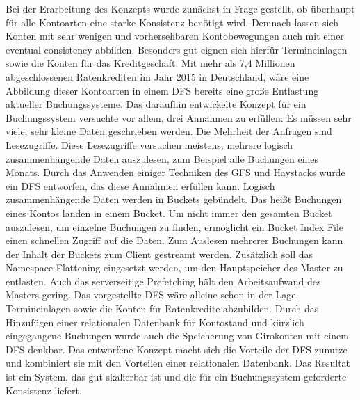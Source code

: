 \documentclass[12pt,oneside,a4paper,parskip]{scrbook}
\begin{document}
Bei der Erarbeitung des Konzepts wurde zunächst in Frage gestellt, ob überhaupt für alle Kontoarten eine starke Konsistenz benötigt wird. Demnach lassen sich Konten mit sehr wenigen und vorhersehbaren Kontobewegungen auch mit einer eventual consistency abbilden. Besonders gut eignen sich hierfür Termineinlagen sowie die Konten für das Kreditgeschäft. Mit mehr als 7,4 Millionen abgeschlossenen Ratenkrediten im Jahr 2015 in Deutschland, wäre eine Abbildung dieser Kontoarten in einem DFS bereits eine große Entlastung aktueller Buchungssysteme. Das daraufhin entwickelte Konzept für ein Buchungssystem versuchte vor allem, drei Annahmen zu erfüllen: Es müssen sehr viele, sehr kleine Daten geschrieben werden. Die Mehrheit der Anfragen sind Lesezugriffe. Diese Lesezugriffe versuchen meistens, mehrere logisch zusammenhängende Daten auszulesen, zum Beispiel alle Buchungen eines Monats. Durch das Anwenden einiger Techniken des GFS und Haystacks wurde ein DFS entworfen, das diese Annahmen erfüllen kann. Logisch zusammenhängende Daten werden in Buckets gebündelt. Das heißt Buchungen eines Kontos landen in einem Bucket. Um nicht immer den gesamten Bucket auszulesen, um einzelne Buchungen zu finden, ermöglicht ein Bucket Index File einen schnellen Zugriff auf die Daten. Zum Auslesen mehrerer Buchungen kann der Inhalt der Buckets zum Client gestreamt werden. Zusätzlich soll das Namespace Flattening eingesetzt werden, um den Hauptspeicher des Master zu entlasten. Auch das serverseitige Prefetching hält den Arbeitsaufwand des Masters gering. Das vorgestellte DFS wäre alleine schon in der Lage, Termineinlagen sowie die Konten für Ratenkredite abzubilden. Durch das Hinzufügen einer relationalen Datenbank für Kontostand und kürzlich eingegangene Buchungen wurde auch die Speicherung von Girokonten mit einem DFS denkbar. Das entworfene Konzept macht sich die Vorteile der DFS zunutze und kombiniert sie mit den Vorteilen einer relationalen Datenbank. Das Resultat ist ein System, das gut skalierbar ist und die für ein Buchungssystem geforderte Konsistenz liefert.
\end{document}
